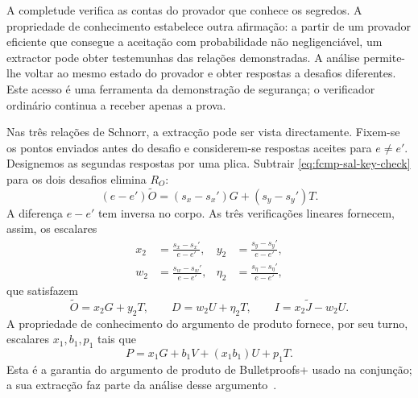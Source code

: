 A completude verifica as contas do provador que conhece os
segredos. A propriedade de conhecimento estabelece outra
afirmação: a partir de um provador eficiente que consegue a
aceitação com probabilidade não negligenciável, um extractor
pode obter testemunhas das relações demonstradas. A análise
permite-lhe voltar ao mesmo estado do provador e obter
respostas a desafios diferentes. Este acesso é uma ferramenta
da demonstração de segurança; o verificador ordinário continua
a receber apenas a prova.

Nas três relações de Schnorr, a extracção pode ser vista
directamente. Fixem-se os pontos enviados antes do desafio e
considerem-se respostas aceites para \(e\ne e'\). Designemos
as segundas respostas por uma plica. Subtrair
\eqref{eq:fcmp-sal-key-check} para os dois desafios elimina
\(R_O\):
\[
 (e-e')\widetilde O
       =(s_x-s_x')G+(s_y-s_y')T.
\]
A diferença \(e-e'\) tem inversa no corpo. As três verificações
lineares fornecem, assim, os escalares
\[
 \begin{aligned}
 x_2&=\frac{s_x-s_x'}{e-e'},&
 y_2&=\frac{s_y-s_y'}{e-e'},\\
 w_2&=\frac{s_w-s_w'}{e-e'},&
 \eta_2&=\frac{s_\eta-s_\eta'}{e-e'},
 \end{aligned}
\]
que satisfazem
\begin{equation}
 \widetilde O=x_2G+y_2T,\qquad
 D=w_2U+\eta_2T,\qquad
 I=x_2\widetilde J-w_2U.
 \label{eq:fcmp-sal-extracted-linear}
\end{equation}
A propriedade de conhecimento do argumento de produto fornece,
por seu turno, escalares \(x_1,b_1,p_1\) tais que
\begin{equation}
 P=x_1G+b_1V+(x_1b_1)U+p_1T.
 \label{eq:fcmp-sal-extracted-product}
\end{equation}
Esta é a garantia do argumento de produto de Bulletproofs+
usado na conjunção; a sua extracção faz parte da análise
desse argumento~\cite{bulletproofs-plus-paper,fcmp-composition-review}.

